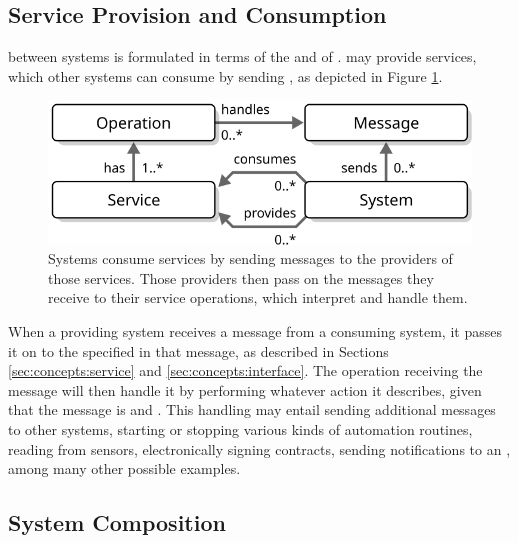 \vspace*{-3mm}

\subsection{Service Provision and Consumption}

 between systems is formulated in terms of the  and  of .
 may provide services, which other systems can consume by sending , as depicted in Figure \ref{fig:service-consumption}.

\begin{figure}[ht!]
  \centering
  \includegraphics[scale=0.9]{figures/service-consumption}
  \caption{
    Systems consume services by sending messages to the providers of those services.
    Those providers then pass on the messages they receive to their service operations, which interpret and handle them.
  }
  \label{fig:service-consumption}
\end{figure}

When a providing system receives a message from a consuming system, it passes it on to the  specified in that message, as described in Sections \ref{sec:concepts:service} and \ref{sec:concepts:interface}.
The operation receiving the message will then handle it by performing whatever action it describes, given that the message is  and .
This handling may entail sending additional messages to other systems, starting or stopping various kinds of automation routines, reading from sensors, electronically signing contracts, sending notifications to an , among many other possible examples.

\subsection{System Composition}


